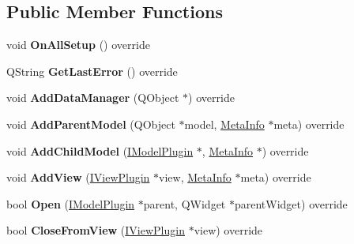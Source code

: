 \subsection*{Public Member Functions}
\begin{DoxyCompactItemize}
\item 
void {\bfseries On\+All\+Setup} () override\hypertarget{class_pomodoro_model_a85c9d12406ed21729f6005dfc908c5cb}{}\label{class_pomodoro_model_a85c9d12406ed21729f6005dfc908c5cb}

\item 
Q\+String {\bfseries Get\+Last\+Error} () override\hypertarget{class_pomodoro_model_a55f5626d19a07eb9a55df33ee85e406d}{}\label{class_pomodoro_model_a55f5626d19a07eb9a55df33ee85e406d}

\item 
void {\bfseries Add\+Data\+Manager} (Q\+Object $\ast$) override\hypertarget{class_pomodoro_model_adcd261354a434841efd78680bf20d931}{}\label{class_pomodoro_model_adcd261354a434841efd78680bf20d931}

\item 
void {\bfseries Add\+Parent\+Model} (Q\+Object $\ast$model, \hyperlink{struct_meta_info}{Meta\+Info} $\ast$meta) override\hypertarget{class_pomodoro_model_a147a7a3a571c687daff22c828707bb0b}{}\label{class_pomodoro_model_a147a7a3a571c687daff22c828707bb0b}

\item 
void {\bfseries Add\+Child\+Model} (\hyperlink{class_i_model_plugin}{I\+Model\+Plugin} $\ast$, \hyperlink{struct_meta_info}{Meta\+Info} $\ast$) override\hypertarget{class_pomodoro_model_a3831623175a6c29ce1a8797ffc11c529}{}\label{class_pomodoro_model_a3831623175a6c29ce1a8797ffc11c529}

\item 
void {\bfseries Add\+View} (\hyperlink{class_i_view_plugin}{I\+View\+Plugin} $\ast$view, \hyperlink{struct_meta_info}{Meta\+Info} $\ast$meta) override\hypertarget{class_pomodoro_model_adedad99bab70c118b5261fe3538ef0ee}{}\label{class_pomodoro_model_adedad99bab70c118b5261fe3538ef0ee}

\item 
bool {\bfseries Open} (\hyperlink{class_i_model_plugin}{I\+Model\+Plugin} $\ast$parent, Q\+Widget $\ast$parent\+Widget) override\hypertarget{class_pomodoro_model_abf2546e06f3d433d6e68d2cb49b9f1c2}{}\label{class_pomodoro_model_abf2546e06f3d433d6e68d2cb49b9f1c2}

\item 
bool {\bfseries Close\+From\+View} (\hyperlink{class_i_view_plugin}{I\+View\+Plugin} $\ast$view) override\hypertarget{class_pomodoro_model_ab6e063b77058b39238b6895d9bfd305c}{}\label{class_pomodoro_model_ab6e063b77058b39238b6895d9bfd305c}


\end{DoxyCompactItemize}
